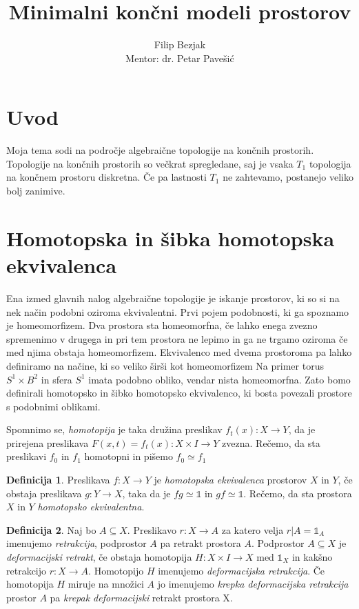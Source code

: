 \documentclass[a4paper,12pt]{article}
\title{Minimalni končni modeli prostorov}
\author{Filip Bezjak \\ Mentor: dr. Petar Pavešić}
\theoremstyle{definition}
\newtheorem{definicija}{Definicija}
\theoremstyle{plain}
\theoremstyle{definition}
\theoremstyle{plain}
\theoremstyle{plain}
\theoremstyle{plain}
\theoremstyle{plain}
\begin{document}
\maketitle

\section{Uvod}
Moja tema sodi na področje algebraične topologije na končnih prostorih. Topologije na končnih prostorih so večkrat spregledane, saj je vsaka $T_1$ topologija
na končnem prostoru diskretna. Če pa lastnosti $T_1$ ne zahtevamo, postanejo veliko bolj
zanimive.

\section{Homotopska in šibka homotopska ekvivalenca}

Ena izmed glavnih nalog algebraične topologije je iskanje prostorov, ki so si 
na nek način podobni oziroma ekvivalentni. Prvi pojem podobnosti, ki ga spoznamo
je homeomorfizem. Dva prostora sta homeomorfna, če lahko enega zvezno spremenimo v drugega in pri tem prostora ne lepimo in ga ne trgamo oziroma če med njima obstaja homeomorfizem. Ekvivalenco med dvema 
prostoroma pa lahko definiramo na načine, ki so veliko širši kot homeomorfizem
Na primer torus $S^1\times B^2$ in sfera $S^1$ imata podobno obliko, vendar nista
 homeomorfna. Zato bomo definirali homotopsko in šibko homotopsko ekvivalenco, ki bosta povezali prostore s podobnimi oblikami.

Spomnimo se, \textit{homotopija} je taka družina preslikav $f_t(x):X \rightarrow Y$, da je prirejena preslikava $F(x,t)=f_t(x):X \times I \rightarrow Y$ zvezna. Rečemo, da sta preslikavi $f_0$ in $f_1$ homotopni in pišemo $f_0 \simeq f_1$


\begin{definicija}
    Preslikava  $f : X \rightarrow Y$ je \textit{homotopska ekvivalenca} prostorov $X$ in $Y$, če obstaja preslikava $g: Y\rightarrow X$, taka da
    je $f g \simeq \mathds{1}$ in $gf \simeq \mathds{1}$. Rečemo, da sta prostora $X$ in
    $Y$  \textit{homotopsko ekvivalentna}.
\end{definicija}

\begin{definicija}
    Naj bo $A \subseteq X$. Preslikavo $r : X \rightarrow A$ za katero 
    velja $r|A = \mathds{1}_A$ imenujemo \textit{retrakcija}, podprostor
     $A$ pa retrakt prostora $A$. Podprostor $A \subseteq X$ je 
     \textit{deformacijski retrakt}, če obstaja homotopija $H : X \times
      I \rightarrow X$ med $\mathds{1}_X$ in kakšno retrakcijo $r : X 
      \rightarrow A$. Homotopijo $H$ imenujemo \textit{deformacijska 
      retrakcija}. Če homotopija $H$ miruje na množici $A$ jo imenujemo 
      \textit{krepka deformacijska retrakcija} prostor $A$ pa 
      \textit{krepak deformacijski} retrakt prostora X.
\end{definicija}
\end{document}
